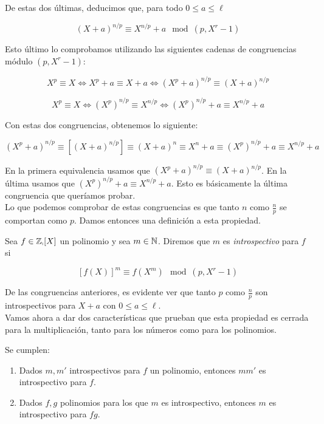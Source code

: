 De estas dos últimas, deducimos que, para todo $0 \leq a \leq \ell$

\begin{equation}\label{identidad_np_introspeccion}
(X + a)^{n/p} \equiv X^{n/p} + a \mod(p, X^r - 1)
\end{equation}

Esto último lo comprobamos utilizando las siguientes cadenas de congruencias módulo $(p, X^r - 1)$:

\[ X^p \equiv X \Leftrightarrow X^p + a \equiv X + a \Leftrightarrow (X^p + a)^{n/p} \equiv (X + a)^{n/p} \]

\[ X^p \equiv X \Leftrightarrow (X^p)^{n/p} \equiv X^{n/p} \Leftrightarrow (X^p)^{n/p} + a \equiv X^{n/p} + a \]

Con estas dos congruencias, obtenemos lo siguiente:

\[ (X^p + a)^{n/p} \equiv \left[(X + a)^{n/p}\right] \equiv (X + a)^n \equiv X^n + a \equiv (X^p)^{n/p} + a \equiv X^{n/p} + a \]

En la primera equivalencia usamos que $(X^p + a)^{n/p} \equiv (X + a)^{n/p}$. En la última usamos que $(X^p)^{n/p} + a \equiv X^{n/p} + a$. Esto es básicamente la última congruencia que queríamos probar.\\

Lo que podemos comprobar de estas congruencias es que tanto $n$ como $\frac{n}{p}$ se comportan como $p$. Damos entonces una definición a esta propiedad.

\begin{definicion}
	Sea $f \in \mathbb{\mathbb{Z}_p}[X]$ un polinomio y sea $m \in \mathbb{N}$. Diremos que $m$ es \textit{introspectivo} para $f$ si
	
	\[ \left[f(X)\right]^m \equiv f(X^m) \mod(p, X^r - 1) \]
\end{definicion}

De las congruencias anteriores, es evidente ver que tanto $p$ como $\frac{n}{p}$ son introspectivos para $X + a$ con $0 \leq a \leq \ell$.\\

Vamos ahora a dar dos características que prueban que esta propiedad es cerrada para la multiplicación, tanto para los números como para los polinomios.

\begin{lema}
	Se cumplen:
	
	\begin{enumerate}
		\item Dados $m, m'$ introspectivos para $f$ un polinomio, entonces $mm'$ es introspectivo para $f$.
		
		\item Dados $f, g$ polinomios para los que $m$ es introspectivo, entonces $m$ es introspectivo para $fg$. 
	\end{enumerate}
\end{lema}

